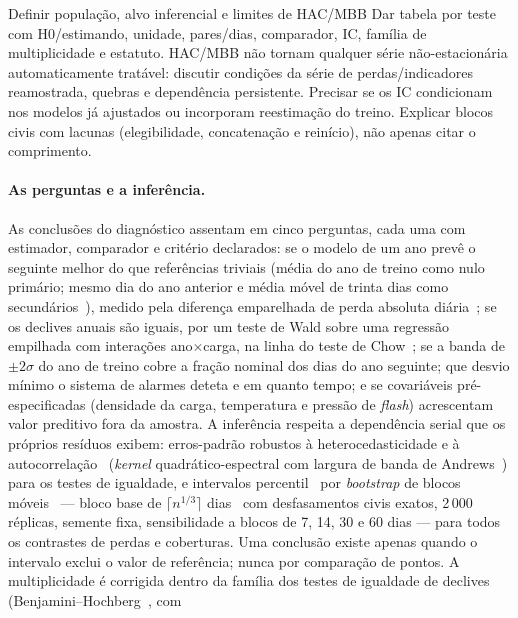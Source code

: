 {Definir população, alvo inferencial e limites de HAC/MBB}
{Dar tabela por teste com H0/estimando, unidade, pares/dias, comparador,
IC, família de multiplicidade e estatuto. HAC/MBB não tornam qualquer
série não-estacionária automaticamente tratável: discutir condições da
série de perdas/indicadores reamostrada, quebras e dependência persistente.
Precisar se os IC condicionam nos modelos já ajustados ou incorporam
reestimação do treino. Explicar blocos civis com lacunas (elegibilidade,
concatenação e reinício), não apenas citar o comprimento.}%
\paragraph{As perguntas e a inferência.} As conclusões do diagnóstico
assentam em cinco perguntas, cada uma com estimador, comparador e
critério declarados: se o modelo de um ano prevê o seguinte melhor do que
referências triviais (média do ano de treino como nulo primário; mesmo dia
do ano anterior e média móvel de trinta dias como secundários~\cite{HyndmanKoehler2006}), medido
pela diferença emparelhada de perda absoluta diária~\cite{DieboldMariano1995,HarveyLeybourneNewbold1997}; se os declives anuais
são iguais, por um teste de Wald sobre uma regressão empilhada com
interações ano$\times$carga, na linha do teste de Chow~\cite{Chow1960}; se a banda de $\pm2\sigma$ do ano de treino
cobre a fração nominal dos dias do ano seguinte; que desvio mínimo o
sistema de alarmes deteta e em quanto tempo; e se covariáveis
pré-especificadas (densidade da carga, temperatura e pressão de
\emph{flash}) acrescentam valor preditivo fora da amostra. A inferência
respeita a dependência serial que os próprios resíduos exibem: erros-padrão
robustos à heterocedasticidade e à autocorrelação~\cite{NeweyWest1987}
(\emph{kernel} quadrático-espectral com largura de banda de
Andrews~\cite{Andrews1991}) para os testes de igualdade, e intervalos percentil~\cite{Efron1979,EfronTibshirani1993} por
\emph{bootstrap} de blocos móveis~\cite{Kunsch1989,Lahiri2003} --- bloco
base de $\lceil n^{1/3}\rceil$ dias~\cite{HallHorowitzJing1995} com
desfasamentos civis exatos, 2\,000 réplicas, semente fixa, sensibilidade a blocos de 7, 14,
30 e 60 dias --- para todos os contrastes de perdas e coberturas. Uma
conclusão existe apenas quando o intervalo exclui o valor de referência;
nunca por comparação de pontos. A multiplicidade é corrigida dentro da
família dos testes de igualdade de declives (Benjamini--Hochberg~\cite{BenjaminiHochberg1995}, com
